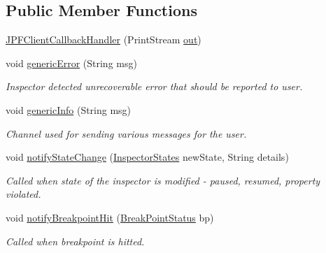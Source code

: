 \subsection*{Public Member Functions}
\begin{DoxyCompactItemize}
\item 
\hyperlink{classgov_1_1nasa_1_1jpf_1_1inspector_1_1client_1_1_j_p_f_client_callback_handler_a7019a1dfc3de8716ba47f45fb979e333}{J\+P\+F\+Client\+Callback\+Handler} (Print\+Stream \hyperlink{classgov_1_1nasa_1_1jpf_1_1inspector_1_1client_1_1_j_p_f_client_callback_handler_ad51e474b5613fa4a46c8965c069fb9f7}{out})
\item 
void \hyperlink{classgov_1_1nasa_1_1jpf_1_1inspector_1_1client_1_1_j_p_f_client_callback_handler_a45f1166c2de66186f2e3a8a29039f863}{generic\+Error} (String msg)
\begin{DoxyCompactList}\small\item\em Inspector detected unrecoverable error that should be reported to user. \end{DoxyCompactList}\item 
void \hyperlink{classgov_1_1nasa_1_1jpf_1_1inspector_1_1client_1_1_j_p_f_client_callback_handler_a9a3766ff337840d00c56e7e1d12fe0bb}{generic\+Info} (String msg)
\begin{DoxyCompactList}\small\item\em Channel used for sending various messages for the user. \end{DoxyCompactList}\item 
void \hyperlink{classgov_1_1nasa_1_1jpf_1_1inspector_1_1client_1_1_j_p_f_client_callback_handler_a9b44a29fb0e6521a255cb116b81ac117}{notify\+State\+Change} (\hyperlink{enumgov_1_1nasa_1_1jpf_1_1inspector_1_1interfaces_1_1_commands_interface_1_1_inspector_states}{Inspector\+States} new\+State, String details)
\begin{DoxyCompactList}\small\item\em Called when state of the inspector is modified -\/ paused, resumed, property violated. \end{DoxyCompactList}\item 
void \hyperlink{classgov_1_1nasa_1_1jpf_1_1inspector_1_1client_1_1_j_p_f_client_callback_handler_ad270cf7f61001a7d3903ff7c52f92419}{notify\+Breakpoint\+Hit} (\hyperlink{interfacegov_1_1nasa_1_1jpf_1_1inspector_1_1interfaces_1_1_break_point_status}{Break\+Point\+Status} bp)
\begin{DoxyCompactList}\small\item\em Called when breakpoint is hitted. \end{DoxyCompactList}\item 

\end{DoxyCompactItemize}
